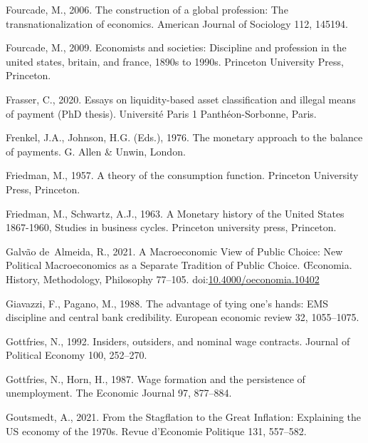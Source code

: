 \documentclass[]{elsarticle} %
\newlength{\cslhangindent}
\newlength{\cslentryspacingunit} %
\newenvironment{CSLReferences}[2] %
 {%
  \setlength{\parindent}{0pt}
  \ifodd #1
  \let\oldpar\par
  \def\par{\hangindent=\cslhangindent\oldpar}
  \fi
  \setlength{\parskip}{#2\cslentryspacingunit}
 }%
 {}
\begin{document}
\begin{CSLReferences}{1}{0}
\leavevmode{}%
Fourcade, M., 2006. The construction of a global profession: The
transnationalization of economics. American Journal of Sociology 112,
145194.

\leavevmode{}%
Fourcade, M., 2009. Economists and societies: Discipline and profession
in the united states, britain, and france, 1890s to 1990s. Princeton
University Press, Princeton.

\leavevmode{}%
Frasser, C., 2020. Essays on liquidity-based asset classiﬁcation and
illegal means of payment (PhD thesis). Université Paris 1
Panthéon-Sorbonne, Paris.

\leavevmode{}%
Frenkel, J.A., Johnson, H.G. (Eds.), 1976. The monetary approach to the
balance of payments. {G. Allen \& Unwin}, {London}.

\leavevmode{}%
Friedman, M., 1957. A theory of the consumption function. Princeton
University Press, Princeton.

\leavevmode{}%
Friedman, M., Schwartz, A.J., 1963. A {Monetary} history of the {United}
{States} 1867-1960, Studies in business cycles. Princeton university
press, Princeton.

\leavevmode{}%
Galvão de~Almeida, R., 2021. A {Macroeconomic View} of {Public Choice}:
{New Political Macroeconomics} as a {Separate Tradition} of {Public
Choice}. Œconomia. History, Methodology, Philosophy 77--105.
doi:\href{https://doi.org/10.4000/oeconomia.10402}{10.4000/oeconomia.10402}

\leavevmode{}%
Giavazzi, F., Pagano, M., 1988. The advantage of tying one's hands:
{EMS} discipline and central bank credibility. European economic review
32, 1055--1075.

\leavevmode{}%
Gottfries, N., 1992. Insiders, outsiders, and nominal wage contracts.
Journal of Political Economy 100, 252--270.

\leavevmode{}%
Gottfries, N., Horn, H., 1987. Wage formation and the persistence of
unemployment. The Economic Journal 97, 877--884.

\leavevmode{}%
Goutsmedt, A., 2021. From the {Stagflation} to the {Great Inflation}:
{Explaining} the {US} economy of the 1970s. Revue d'Economie Politique
131, 557--582.


\end{CSLReferences}
\end{document}
